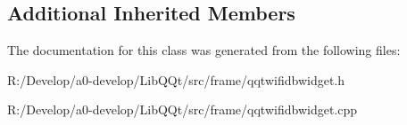\subsection*{Additional Inherited Members}


The documentation for this class was generated from the following files\+:\begin{DoxyCompactItemize}
\item 
R\+:/\+Develop/a0-\/develop/\+Lib\+Q\+Qt/src/frame/qqtwifidbwidget.\+h\item 
R\+:/\+Develop/a0-\/develop/\+Lib\+Q\+Qt/src/frame/qqtwifidbwidget.\+cpp\end{DoxyCompactItemize}
